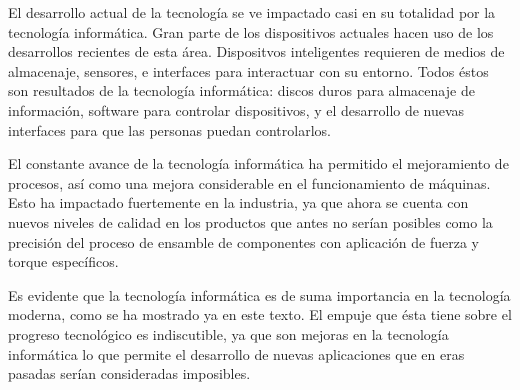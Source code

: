 \documentclass[a4paper,12pt]{article}
\begin{document}
El desarrollo actual de la tecnología se ve impactado casi en su totalidad por la tecnología informática.
Gran parte de los dispositivos actuales hacen uso de los desarrollos recientes de esta área.
Dispositvos inteligentes requieren de medios de almacenaje, sensores, e interfaces para interactuar con su entorno.
Todos éstos son resultados de la tecnología informática: discos duros para almacenaje de información, software para controlar dispositivos, y el desarrollo de nuevas interfaces para que las personas puedan controlarlos.

El constante avance de la tecnología informática ha permitido el mejoramiento de procesos, así como una mejora considerable en el funcionamiento de máquinas.
Esto ha impactado fuertemente en la industria, ya que ahora se cuenta con nuevos niveles de calidad en los productos que antes no serían posibles como la precisión del proceso de ensamble de componentes con aplicación de fuerza y torque específicos.

Es evidente que la tecnología informática es de suma importancia en la tecnología moderna, como se ha mostrado ya en este texto.
El empuje que ésta tiene sobre el progreso tecnológico es indiscutible, ya que son mejoras en la tecnología informática lo que permite el desarrollo de nuevas aplicaciones que en eras pasadas serían consideradas imposibles.


\end{document}

